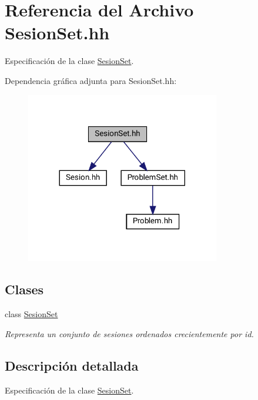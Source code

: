 \hypertarget{_sesion_set_8hh}{}\section{Referencia del Archivo Sesion\+Set.\+hh}
\label{_sesion_set_8hh}


Especificación de la clase \mbox{\hyperlink{class_sesion_set}{Sesion\+Set}}.  


Dependencia gráfica adjunta para Sesion\+Set.\+hh\+:\nopagebreak
\begin{figure}[H]
\begin{center}
\leavevmode
\includegraphics[width=240pt]{_sesion_set_8hh__incl}
\end{center}
\end{figure}
\subsection*{Clases}
\begin{DoxyCompactItemize}
\item 
class \mbox{\hyperlink{class_sesion_set}{Sesion\+Set}}
\begin{DoxyCompactList}\small\item\em Representa un conjunto de sesiones ordenados crecientemente por id. \end{DoxyCompactList}\end{DoxyCompactItemize}


\subsection{Descripción detallada}
Especificación de la clase \mbox{\hyperlink{class_sesion_set}{Sesion\+Set}}. 

